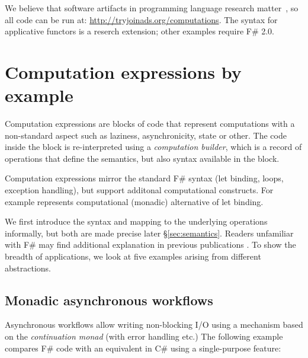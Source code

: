 \documentclass[runningheads,a4paper]{llncs}
\begin{document}
\vspace{1.0em}
\noindent
We believe that software artifacts in programming language research matter~\cite{artifacts}, so all 
code can be run at: \url{http://tryjoinads.org/computations}. 
The syntax for applicative functors is a reserch extension; other examples require F\# 2.0.


\section{Computation expressions by example}
\label{sec:intro}

Computation expressions are blocks of code that represent computations with a non-standard 
aspect such as laziness, asynchronicity, state or other. The code inside the block is re-interpreted 
using a \emph{computation builder}, which is a record of operations that define the semantics,
but also syntax available in the block.

Computation expressions mirror the standard F\# syntax (let binding, loops, exception handling),
but support additonal computational constructs. For example  represents computational 
(monadic) alternative of let binding.

We first introduce the syntax and mapping to the underlying operations informally, but both are made 
precise later \S\ref{sec:semantics}. Readers unfamiliar with F\# may find additional explanation
in previous publications \cite{fsharp-expert,fsharp-spec}. To show the breadth of applications, 
we look at five examples arising from different abstractions.


\subsection{Monadic asynchronous workflows}
\label{sec:intro-async}

Asynchronous workflows \cite{fs-async} allow writing non-blocking I/O using a mechanism based on the 
\emph{continuation monad} (with error handling etc.) The following example compares F\# code
with an equivalent in C\# using a single-purpose feature:
\end{document}
